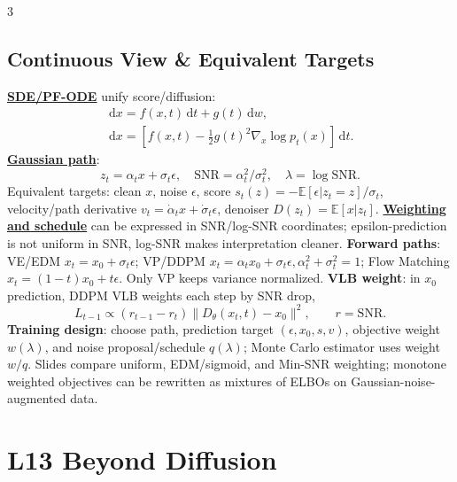 \documentclass{article}
\numberwithin{equation}{subsection}
\newcommand{\key}[1]{\textbf{#1}}
\newcommand{\lowterm}[1]{\textbf{\underline{#1}}}
\newcommand{\E}{\mathbb{E}}
\newcommand{\dd}{\,\mathrm{d}}
\begin{document}
\begin{multicols*}{3}
\subsection{Continuous View \& Equivalent Targets}
\lowterm{SDE/PF-ODE} unify score/diffusion:
\[
\begin{gathered}
\dd x=f(x,t)\dd t+g(t)\dd w,\\
\dd x=\left[f(x,t)-\frac12g(t)^2\nabla_x\log p_t(x)\right]\dd t.
\end{gathered}
\]
\lowterm{Gaussian path}:
\[
z_t=\alpha_t x+\sigma_t\epsilon,\quad \mathrm{SNR}=\alpha_t^2/\sigma_t^2,\quad \lambda=\log \mathrm{SNR}.
\]
Equivalent targets: clean $x$, noise $\epsilon$, score $s_t(z)=-\E[\epsilon|z_t=z]/\sigma_t$, velocity/path derivative $v_t=\dot\alpha_tx+\dot\sigma_t\epsilon$, denoiser $D(z_t)=\E[x|z_t]$. \lowterm{Weighting and schedule} can be expressed in SNR/log-SNR coordinates; epsilon-prediction is not uniform in SNR, log-SNR makes interpretation cleaner.
\key{Forward paths}: VE/EDM $x_t=x_0+\sigma_t\epsilon$; VP/DDPM $x_t=\alpha_tx_0+\sigma_t\epsilon,\alpha_t^2+\sigma_t^2=1$; Flow Matching $x_t=(1-t)x_0+t\epsilon$. Only VP keeps variance normalized. \key{VLB weight}: in $x_0$ prediction, DDPM VLB weights each step by SNR drop,
\[
L_{t-1}\propto (r_{t-1}-r_t)\|D_\theta(x_t,t)-x_0\|^2,\qquad r=\mathrm{SNR}.
\]
\key{Training design}: choose path, prediction target $(\epsilon,x_0,s,v)$, objective weight $w(\lambda)$, and noise proposal/schedule $q(\lambda)$; Monte Carlo estimator uses weight $w/q$. Slides compare uniform, EDM/sigmoid, and Min-SNR weighting; monotone weighted objectives can be rewritten as mixtures of ELBOs on Gaussian-noise-augmented data.

\section{L13 Beyond Diffusion}

\end{multicols*}
\end{document}
